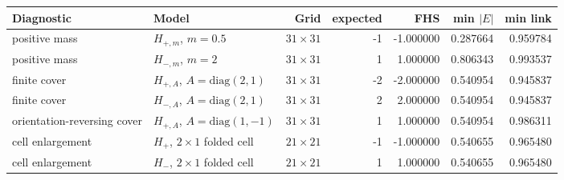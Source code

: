 \begin{tabular}{llrrrrr}\toprule
Diagnostic & Model & Grid & expected & FHS & min $|E|$ & min link \\
\midrule
positive mass & $H_{+,m}$, $m=0.5$ & $31\times31$ & -1 & -1.000000 & 0.287664 & 0.959784 \\
positive mass & $H_{-,m}$, $m=2$ & $31\times31$ & 1 & 1.000000 & 0.806343 & 0.993537 \\
finite cover & $H_{+,A}$, $A=\mathrm{diag}(2,1)$ & $31\times31$ & -2 & -2.000000 & 0.540954 & 0.945837 \\
finite cover & $H_{-,A}$, $A=\mathrm{diag}(2,1)$ & $31\times31$ & 2 & 2.000000 & 0.540954 & 0.945837 \\
orientation-reversing cover & $H_{+,A}$, $A=\mathrm{diag}(1,-1)$ & $31\times31$ & 1 & 1.000000 & 0.540954 & 0.986311 \\
cell enlargement & $H_+$, $2\times1$ folded cell & $21\times21$ & -1 & -1.000000 & 0.540655 & 0.965480 \\
cell enlargement & $H_-$, $2\times1$ folded cell & $21\times21$ & 1 & 1.000000 & 0.540655 & 0.965480 \\
\bottomrule
\end{tabular}
